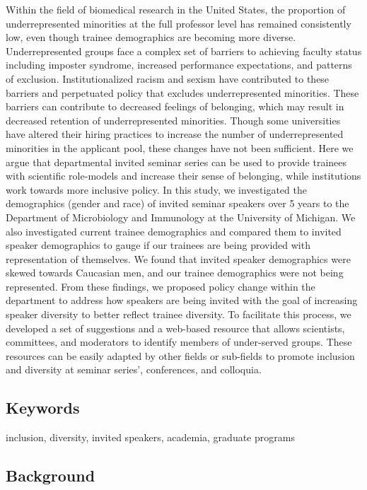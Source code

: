 \documentclass[10pt,]{article}
\begin{document}
Within the field of biomedical research in the United States, the
proportion of underrepresented minorities at the full professor level
has remained consistently low, even though trainee demographics are
becoming more diverse. Underrepresented groups face a complex set of
barriers to achieving faculty status including imposter syndrome,
increased performance expectations, and patterns of exclusion.
Institutionalized racism and sexism have contributed to these barriers
and perpetuated policy that excludes underrepresented minorities. These
barriers can contribute to decreased feelings of belonging, which may
result in decreased retention of underrepresented minorities. Though
some universities have altered their hiring practices to increase the
number of underrepresented minorities in the applicant pool, these
changes have not been sufficient. Here we argue that departmental
invited seminar series can be used to provide trainees with scientific
role-models and increase their sense of belonging, while institutions
work towards more inclusive policy. In this study, we investigated the
demographics (gender and race) of invited seminar speakers over 5 years
to the Department of Microbiology and Immunology at the University of
Michigan. We also investigated current trainee demographics and compared
them to invited speaker demographics to gauge if our trainees are being
provided with representation of themselves. We found that invited
speaker demographics were skewed towards Caucasian men, and our trainee
demographics were not being represented. From these findings, we
proposed policy change within the department to address how speakers are
being invited with the goal of increasing speaker diversity to better
reflect trainee diversity. To facilitate this process, we developed a
set of suggestions and a web-based resource that allows scientists,
committees, and moderators to identify members of under-served groups.
These resources can be easily adapted by other fields or sub-fields to
promote inclusion and diversity at seminar series', conferences, and
colloquia.

\subsection{Keywords}\label{keywords}

inclusion, diversity, invited speakers, academia, graduate programs

\newpage

\subsection{Background}\label{background}
\end{document}
